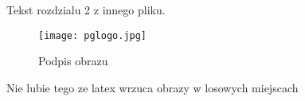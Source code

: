 \documentclass[../main.tex]{subfiles}
\begin{document}
Tekst rozdzialu 2 z innego pliku. 
\begin{figure}
\centering
\texttt{[image: pglogo.jpg]}
\label{fig:img1}
\caption{Podpis obrazu}
\end{figure}
Nie lubie tego ze latex wrzuca obrazy w losowych miejscach
\end{document}
